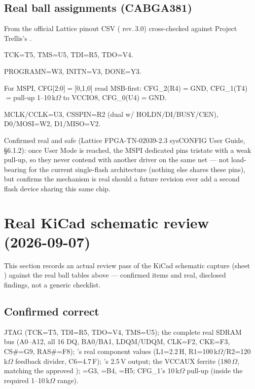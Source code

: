 \subsection{Real ball assignments (CABGA381)}
From the official Lattice pinout CSV ( rev.\,3.0) cross-checked against Project
Trellis's .

\begin{fnnote}
TCK=T5, TMS=U5, TDI=R5, TDO=V4.
\end{fnnote}
\begin{fnnote}
PROGRAMN=W3, INITN=V3, DONE=Y3.
\end{fnnote}
\begin{fnnote}
For MSPI, CFG[2:0]$=$[0,1,0] read MSB-first: CFG\_2(R4)$=$GND,
CFG\_1(T4)$=$pull-up 1--10\,k$\Omega$ to VCCIO8, CFG\_0(U4)$=$GND.
\end{fnnote}
\begin{fnnote}
MCLK/CCLK=U3, CSSPIN=R2 (dual w/ HOLDN/DI/BUSY/CEN), D0/MOSI=W2,
D1/MISO=V2.
\end{fnnote}

Confirmed real and safe (Lattice FPGA-TN-02039-2.3 sysCONFIG User
Guide, \S6.1.2): once User Mode is reached, the MSPI dedicated pins
tristate with a weak pull-up, so they never contend with another
driver on the same net --- not load-bearing for the current
single-flash architecture (nothing else shares these pins), but
confirms the mechanism is real should a future revision ever add a
second flash device sharing this same chip.

\section{Real KiCad schematic review (2026-09-07)}
\label{sec:schematic-review}
\begin{fnwarn}
This section records an actual review pass of the KiCad schematic
capture (sheet ) against the real
ball tables above --- confirmed items and real, disclosed findings,
not a generic checklist.
\end{fnwarn}

\subsection{Confirmed correct}
JTAG (TCK=T5, TDI=R5, TDO=V4, TMS=U5); the complete real SDRAM bus
(A0--A12, all 16 DQ, BA0/BA1, LDQM/UDQM, CLK=F2, CKE=F3, CS\#=G9,
RAS\#=F8); 's real component values (L1=2.2\,\textmu H,
R1=100\,k$\Omega$/R2=120\,k$\Omega$ feedback divider, C6=4.7\,\textmu F);
's 2.5\,V output; the VCCAUX ferrite (180\,$\Omega$,
matching the approved ); =G3,
=B4, =H5; CFG\_1's 10\,k$\Omega$
pull-up (inside the required 1--10\,k$\Omega$ range).

